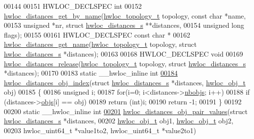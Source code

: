 \begin{DoxyCode}
00144 
00151 HWLOC\_DECLSPEC \textcolor{keywordtype}{int}
00152 \hyperlink{a00208_gaa457f35b8745ca41ec17797c0d7b20f0}{hwloc\_distances\_get\_by\_name}(\hyperlink{a00186_ga9d1e76ee15a7dee158b786c30b6a6e38}{hwloc\_topology\_t} topology, \textcolor{keyword}{const} \textcolor{keywordtype}{
      char} *name,
00153                             \textcolor{keywordtype}{unsigned} *nr, \textcolor{keyword}{struct} \hyperlink{a00310}{hwloc\_distances\_s} **distances,
00154                             \textcolor{keywordtype}{unsigned} \textcolor{keywordtype}{long} flags);
00155 
00161 HWLOC\_DECLSPEC \textcolor{keyword}{const} \textcolor{keywordtype}{char} *
00162 \hyperlink{a00208_gaa6f9697028c589cef0458edef5fe273f}{hwloc\_distances\_get\_name}(\hyperlink{a00186_ga9d1e76ee15a7dee158b786c30b6a6e38}{hwloc\_topology\_t} topology, \textcolor{keyword}{struct} 
      \hyperlink{a00310}{hwloc\_distances\_s} *distances);
00163 
00168 HWLOC\_DECLSPEC \textcolor{keywordtype}{void}
00169 \hyperlink{a00208_ga1dd78c1f9acd54f26aba0e284e97e51d}{hwloc\_distances\_release}(\hyperlink{a00186_ga9d1e76ee15a7dee158b786c30b6a6e38}{hwloc\_topology\_t} topology, \textcolor{keyword}{struct} 
      \hyperlink{a00310}{hwloc\_distances\_s} *distances);
00170 
00183 \textcolor{keyword}{static} \_\_hwloc\_inline \textcolor{keywordtype}{int}
\hyperlink{a00209_gab9e770c7d56c5d6040f26bd1dc8854cd}{00184} \hyperlink{a00209_gab9e770c7d56c5d6040f26bd1dc8854cd}{hwloc\_distances\_obj\_index}(\textcolor{keyword}{struct} \hyperlink{a00310}{hwloc\_distances\_s} *distances, 
      \hyperlink{a00238}{hwloc\_obj\_t} obj)
00185 \{
00186   \textcolor{keywordtype}{unsigned} i;
00187   \textcolor{keywordflow}{for}(i=0; i<distances->\hyperlink{a00310_a4ca2af858cebbce7324ec49903d09474}{nbobjs}; i++)
00188     \textcolor{keywordflow}{if} (distances->\hyperlink{a00310_af1e78b2d628d191fa6cae3fbfe891078}{objs}[i] == obj)
00189       \textcolor{keywordflow}{return} (\textcolor{keywordtype}{int})i;
00190   \textcolor{keywordflow}{return} -1;
00191 \}
00192 
00200 \textcolor{keyword}{static} \_\_hwloc\_inline \textcolor{keywordtype}{int}
\hyperlink{a00209_ga3c665b23056e3269f777b21a67148c82}{00201} \hyperlink{a00209_ga3c665b23056e3269f777b21a67148c82}{hwloc\_distances\_obj\_pair\_values}(\textcolor{keyword}{struct} 
      \hyperlink{a00310}{hwloc\_distances\_s} *distances,
00202                                 \hyperlink{a00238}{hwloc\_obj\_t} obj1, \hyperlink{a00238}{hwloc\_obj\_t} obj2,
00203                                 hwloc\_uint64\_t *value1to2, hwloc\_uint64\_t *value2to1)

\end{DoxyCode}
